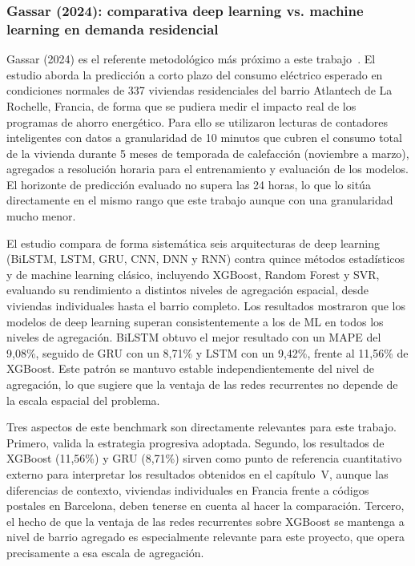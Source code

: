 \documentclass[12pt, a4paper]{article}
\begin{document}
\subsubsection{Gassar (2024): comparativa deep learning vs. machine learning en demanda residencial}

Gassar (2024) es el referente metodológico más próximo a este trabajo~\cite{gassar2024}. El estudio aborda la predicción a corto plazo del consumo eléctrico esperado en condiciones normales de 337 viviendas residenciales del barrio Atlantech de La Rochelle, Francia, de forma que se pudiera medir el impacto real de los programas de ahorro energético. Para ello se utilizaron lecturas de contadores inteligentes con datos a granularidad de 10 minutos que cubren el consumo total de la vivienda durante 5 meses de temporada de calefacción (noviembre a marzo), agregados a resolución horaria para el entrenamiento y evaluación de los modelos. El horizonte de predicción evaluado no supera las 24 horas, lo que lo sitúa directamente en el mismo rango que este trabajo aunque con una granularidad mucho menor.

El estudio compara de forma sistemática seis arquitecturas de deep learning (BiLSTM, LSTM, GRU, CNN, DNN y RNN) contra quince métodos estadísticos y de machine learning clásico, incluyendo XGBoost, Random Forest y SVR, evaluando su rendimiento a distintos niveles de agregación espacial, desde viviendas individuales hasta el barrio completo. Los resultados mostraron que los modelos de deep learning superan consistentemente a los de ML en todos los niveles de agregación. BiLSTM obtuvo el mejor resultado con un MAPE del 9,08\%, seguido de GRU con un 8,71\% y LSTM con un 9,42\%, frente al 11,56\% de XGBoost. Este patrón se mantuvo estable independientemente del nivel de agregación, lo que sugiere que la ventaja de las redes recurrentes no depende de la escala espacial del problema.

Tres aspectos de este benchmark son directamente relevantes para este trabajo. Primero, valida la estrategia progresiva adoptada. Segundo, los resultados de XGBoost (11,56\%) y GRU (8,71\%) sirven como punto de referencia cuantitativo externo para interpretar los resultados obtenidos en el capítulo~V, aunque las diferencias de contexto, viviendas individuales en Francia frente a códigos postales en Barcelona, deben tenerse en cuenta al hacer la comparación. Tercero, el hecho de que la ventaja de las redes recurrentes sobre XGBoost se mantenga a nivel de barrio agregado es especialmente relevante para este proyecto, que opera precisamente a esa escala de agregación.
\end{document}
